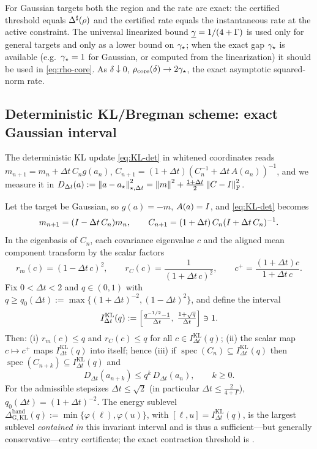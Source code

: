 \begin{remark}
\label{rem:rate-region}
For Gaussian targets both the region and the rate are exact: the certified threshold equals
$\Delta^{\sharp}(\rho)$ and the certified rate equals the instantaneous rate at the active
constraint. The universal linearized bound $\underline{\gamma}=1/(4+\Gamma)$ is used only for general
targets and only as a lower bound on $\gamma_\star$; when the exact gap $\gamma_\star$ is available
(e.g.\ $\gamma_\star=1$ for Gaussian, or computed from the linearization) it should be used in
\eqref{eq:rho-core}. As $\delta\downarrow0$, $\rho_{\mathrm{core}}(\delta)\to2\gamma_\star$, the
exact asymptotic squared-norm rate.
\end{remark}

\subsection{Deterministic KL/Bregman scheme: exact Gaussian interval}
\label{subsec:kl-local}

The deterministic KL update \eqref{eq:KL-det} in whitened coordinates reads
$m_{n+1}=m_n+\Delta t\,C_ng(a_n)$, $C_{n+1}=(1+\Delta t)(C_n^{-1}+\Delta t\,A(a_n))^{-1}$,
and we measure it in $D_{\Delta t}(a):=\left\lVert a-a_\star\right\rVert_{\star,\Delta t}^2=\left\lVert m\right\rVert^2+\tfrac{1+\Delta t}2\left\lVert C-I\right\rVert_{\mathrm{F}}^2$.

\begin{proposition}
\label{prop:kl-gauss}
Let the target be Gaussian, so $g(a)=-m$, $A(a)=I$, and \eqref{eq:KL-det} becomes
\[
    m_{n+1}=(I-\Delta t\,C_n)m_n,
    \qquad
    C_{n+1}=(1+\Delta t)\,C_n(I+\Delta t\,C_n)^{-1}.
\]
In the eigenbasis of $C_n$, each covariance eigenvalue $c$ and the aligned mean component
transform by the scalar factors
\[
    r_m(c)=(1-\Delta t\,c)^2,
    \qquad
    r_C(c)=\frac1{(1+\Delta t\,c)^2},
    \qquad
    c^+=\frac{(1+\Delta t)c}{1+\Delta t\,c}.
\]
Fix $0<\Delta t<2$ and $q\in(0,1)$ with $q\geq q_0(\Delta t):=\max\{(1+\Delta t)^{-2},(1-\Delta t)^2\}$,
and define the interval
\begin{equation}
\label{eq:kl-interval}
    I_{\Delta t}^{\mathrm{KL}}(q):=\Bigl[\tfrac{q^{-1/2}-1}{\Delta t},\;\tfrac{1+\sqrt q}{\Delta t}\Bigr]\ni1 .
\end{equation}
Then: (i) $r_m(c)\leq q$ and $r_C(c)\leq q$ for all $c\in I_{\Delta t}^{\mathrm{KL}}(q)$;
(ii) the scalar map $c\mapsto c^+$ maps $I_{\Delta t}^{\mathrm{KL}}(q)$ into itself; hence
(iii) if $\operatorname{spec}(C_n)\subseteq I_{\Delta t}^{\mathrm{KL}}(q)$ then
$\operatorname{spec}(C_{n+k})\subseteq I_{\Delta t}^{\mathrm{KL}}(q)$ and
\[
    D_{\Delta t}(a_{n+k})\leq q^k\,D_{\Delta t}(a_n),\qquad k\geq0 .
\]
For the admissible stepsizes $\Delta t\leq\sqrt2$ (in particular $\Delta t\leq\tfrac2{4+\Gamma}$),
$q_0(\Delta t)=(1+\Delta t)^{-2}$. The energy sublevel
$\Delta_{\mathrm{G,KL}}^{\mathrm{band}}(q):=\min\{\varphi(\ell),\varphi(u)\}$, with
$[\ell,u]=I_{\Delta t}^{\mathrm{KL}}(q)$, is the largest sublevel \emph{contained in} this
invariant interval and is thus a sufficient---but generally conservative---entry certificate;
the exact contraction threshold is .
\end{proposition}

